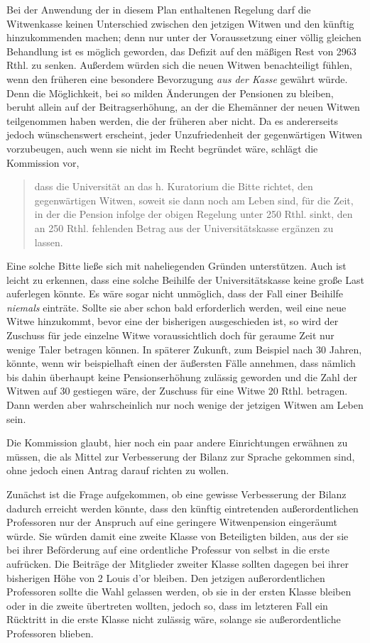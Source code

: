 Bei der Anwendung der in diesem Plan enthaltenen Regelung darf die Witwenkasse keinen
Unterschied zwischen den jetzigen Witwen und den künftig hinzukommenden machen; denn nur unter der Voraussetzung einer völlig gleichen Behandlung ist es möglich geworden, das Defizit auf den mäßigen Rest von 2963 Rthl. zu senken. Außerdem würden sich die neuen Witwen benachteiligt fühlen, wenn den früheren eine besondere Bevorzugung \textit{aus der Kasse} gewährt würde. Denn die Möglichkeit, bei so milden Änderungen der Pensionen zu bleiben, beruht allein auf der Beitragserhöhung, an der die Ehemänner der neuen Witwen teilgenommen haben werden, die der früheren aber nicht. Da es andererseits jedoch wünschenswert erscheint, jeder Unzufriedenheit der gegenwärtigen Witwen vorzubeugen, auch wenn sie nicht im Recht begründet wäre, schlägt die Kommission vor,
\begin{quote}
dass die Universität an das h. Kuratorium die Bitte richtet, den gegenwärtigen Witwen, soweit sie dann noch am Leben sind, für die Zeit, in der die Pension infolge der obigen Regelung unter 250 Rthl. sinkt, den an 250 Rthl. fehlenden Betrag aus der Universitätskasse ergänzen zu lassen.
\end{quote}
\noindent\hspace*{\parindent}Eine solche Bitte ließe sich mit naheliegenden Gründen unterstützen. Auch ist leicht zu erkennen, dass eine solche Beihilfe der Universitätskasse keine große Last auferlegen könnte. Es wäre sogar nicht unmöglich, dass der Fall einer Beihilfe \textit{niemals} einträte. Sollte sie aber schon bald erforderlich werden, weil eine neue Witwe hinzukommt, bevor eine der bisherigen ausgeschieden ist, so wird der Zuschuss für jede einzelne Witwe voraussichtlich doch für geraume Zeit nur wenige Taler betragen können. In späterer Zukunft, zum Beispiel nach 30 Jahren, könnte, wenn wir beispielhaft einen der äußersten Fälle annehmen, dass nämlich bis dahin überhaupt keine Pensionserhöhung zulässig geworden und die Zahl der Witwen auf 30 gestiegen wäre, der Zuschuss für eine Witwe 20 Rthl. betragen. Dann werden aber wahrscheinlich nur noch wenige der jetzigen Witwen am Leben sein.

Die Kommission glaubt, hier noch ein paar andere Einrichtungen erwähnen zu müssen, die als Mittel zur Verbesserung der Bilanz zur Sprache gekommen sind, ohne jedoch einen Antrag darauf richten zu wollen.

Zunächst ist die Frage aufgekommen, ob eine gewisse Verbesserung der Bilanz dadurch erreicht werden könnte, dass den künftig eintretenden außerordentlichen Professoren nur der Anspruch auf eine geringere Witwenpension eingeräumt würde. Sie würden damit eine zweite Klasse von Beteiligten bilden, aus der sie bei ihrer Beförderung auf eine ordentliche Professur von selbst in die erste aufrücken. Die Beiträge der Mitglieder zweiter Klasse sollten dagegen bei ihrer bisherigen Höhe von 2 Louis d'or bleiben. Den jetzigen außerordentlichen Professoren sollte die Wahl gelassen werden, ob sie in der ersten Klasse bleiben oder in die zweite übertreten wollten, jedoch so, dass im letzteren Fall ein Rücktritt in die erste Klasse nicht zulässig wäre, solange sie außerordentliche Professoren blieben.

